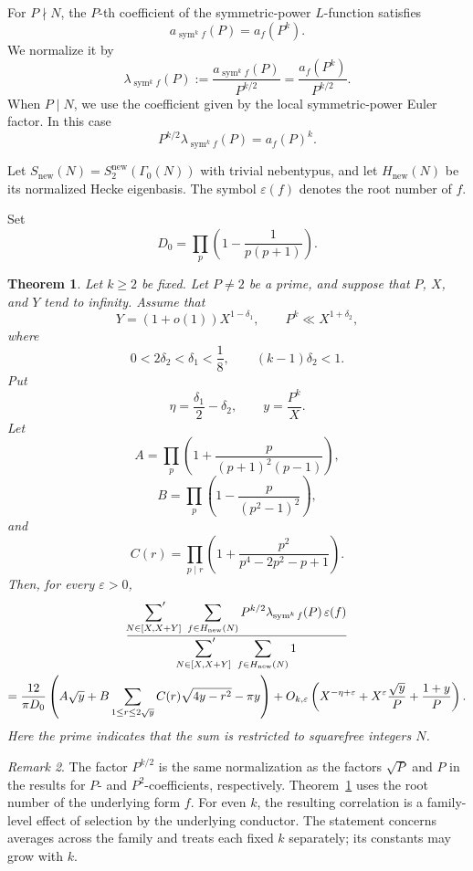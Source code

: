 \documentclass[12pt,reqno]{amsart}
\numberwithin{equation}{section}
\theoremstyle{plain}
\newtheorem{theorem}{Theorem}[section]
\theoremstyle{definition}
\theoremstyle{remark}
\newtheorem{remark}[theorem]{Remark}
\newcommand{\sym}{\operatorname{sym}}
\begin{document}
For $P\nmid N$, the $P$-th coefficient of the symmetric-power $L$-function satisfies
\[
a_{\sym^k f}(P)=a_f(P^k).
\]
We normalize it by
\[
\lambda_{\sym^k f}(P)
:=
\frac{a_{\sym^k f}(P)}{P^{k/2}}
=
\frac{a_f(P^k)}{P^{k/2}}.
\]
When $P\mid N$, we use the coefficient given by the local symmetric-power Euler factor.
In this case
\[
P^{k/2}\lambda_{\sym^k f}(P)=a_f(P)^k.
\]

Let
$S_{\mathrm{new}}(N)=S_2^{\mathrm{new}}(\Gamma_0(N))$ with trivial nebentypus, and let $H_{\mathrm{new}}(N)$ be its normalized Hecke eigenbasis.
The symbol $\varepsilon(f)$ denotes the root number of $f$.

Set
\[
D_0=\prod_p\left(1-\frac{1}{p(p+1)}\right).
\]

\begin{theorem}\label{thm:scaled-murmuration}
Let $k\geq 2$ be fixed.  Let $P\neq 2$ be a prime, and suppose that $P$, $X$, and $Y$ tend to infinity.
Assume that
\[
Y=(1+o(1))X^{1-\delta_1},
\qquad
P^k\ll X^{1+\delta_2},
\]
where
\[
0<2\delta_2<\delta_1<\frac18,
\qquad
(k-1)\delta_2<1.
\]
Put
\[
\eta=\frac{\delta_1}{2}-\delta_2,
\qquad
y=\frac{P^k}{X}.
\]
Let
\[
A=\prod_p\left(1+\frac{p}{(p+1)^2(p-1)}\right),
\]
\[
B=\prod_p\left(1-\frac{p}{(p^2-1)^2}\right),
\]
and
\[
C(r)=\prod_{p\mid r}
\left(1+\frac{p^2}{p^4-2p^2-p+1}\right).
\]
Then, for every $\varepsilon>0$,
\begin{multline*}
\frac{
\displaystyle
\sideset{}{'}\sum_{N\in[X,X+Y]}
\ \sum_{f\in H_{\mathrm{new}}(N)}
P^{k/2}\lambda_{\sym^k f}(P)\,\varepsilon(f)
}{
\displaystyle
\sideset{}{'}\sum_{N\in[X,X+Y]}
\ \sum_{f\in H_{\mathrm{new}}(N)}1
}
\\
=
\frac{12}{\pi D_0}
\left(
A\sqrt y
+
B\sum_{1\leq r\leq 2\sqrt y}
C(r)\sqrt{4y-r^2}
-\pi y
\right)
+
O_{k,\varepsilon}\left(
X^{-\eta+\varepsilon}
+X^\varepsilon\frac{\sqrt y}{P}
+\frac{1+y}{P}
\right).
\end{multline*}
Here the prime indicates that the sum is restricted to squarefree integers $N$.
\end{theorem}

\begin{remark}
The factor $P^{k/2}$ is the same normalization as the factors $\sqrt P$ and $P$ in the results for $P$- and $P^2$-coefficients, respectively.
Theorem~\ref{thm:scaled-murmuration} uses the root number of the underlying form $f$.
For even $k$, the resulting correlation is a family-level effect of selection by the underlying conductor.
The statement concerns averages across the family and treats each fixed $k$ separately; its constants may grow with $k$.
\end{remark}
\end{document}
